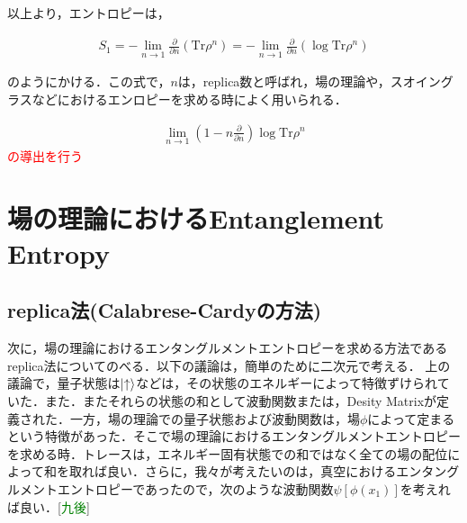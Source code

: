以上より，エントロピーは，
\begin{empheqboxed}

  \begin{align}
    \label{replica}
    S_{1}=-\lim_{n \to 1}\frac{\partial}{\partial n}(\mathrm{Tr}\rho^n)=-\lim_{n \to 1}\frac{\partial}{\partial n}(\log\mathrm{Tr}\rho^{n})
  \end{align}

\end{empheqboxed}
のようにかける．この式で，$n$は，replica数と呼ばれ，場の理論や，スオイングラスなどにおけるエンロピーを求める時によく用いられる．

\begin{align}
  \lim_{n \to 1}(1-n\frac{\partial}{\partial n})\log \mathrm{Tr}\rho^{n}
\end{align}
\textcolor{red}{の導出を行う}
\section{場の理論におけるEntanglement Entropy\cite{15}\cite{16}\cite{17}\cite{18}}
\subsection{replica法(Calabrese-Cardyの方法)}
次に，場の理論におけるエンタングルメントエントロピーを求める方法であるreplica法についてのべる．以下の議論は，簡単のために二次元で考える．
上の議論で，量子状態は$\ket{\uparrow}$などは，その状態のエネルギーによって特徴ずけられていた．また．またそれらの状態の和として波動関数または，Desity Matrixが定義された．一方，場の理論での量子状態および波動関数は，場$\phi$によって定まるという特徴があった．そこで場の理論におけるエンタングルメントエントロピーを求める時．トレースは，エネルギー固有状態での和ではなく全ての場の配位によって和を取れば良い．さらに，我々が考えたいのは，真空におけるエンタングルメントエントロピーであったので，次のような波動関数$\psi[\phi(x_{1})]$を考えれば良い．[\textcolor{green}{九後}]


